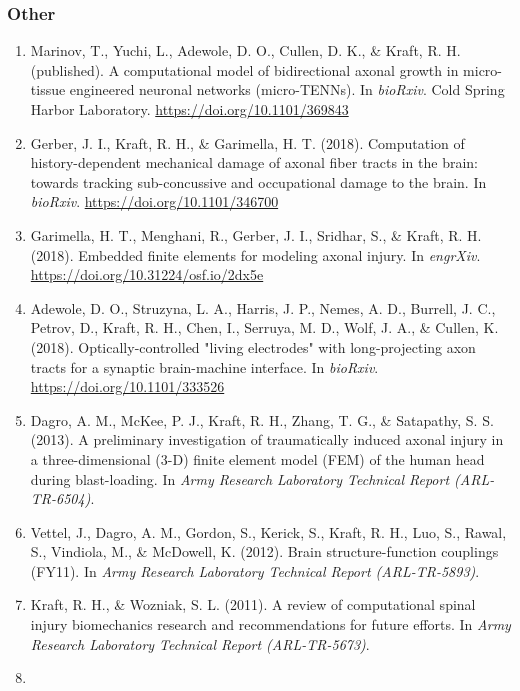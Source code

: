 \documentclass[
]{article}
\begin{document}
\subsubsection{Other}\label{other}

\begin{enumerate}
\def\labelenumi{\arabic{enumi}.}
\item
  Marinov, T., Yuchi, L., Adewole, D. O., Cullen, D. K., \& Kraft, R. H.
  (published). A computational model of bidirectional axonal growth in
  micro-tissue engineered neuronal networks (micro-TENNs). In
  \emph{bioRxiv}. Cold Spring Harbor Laboratory.
  \url{https://doi.org/10.1101/369843}
\item
  Gerber, J. I., Kraft, R. H., \& Garimella, H. T. (2018). Computation
  of history-dependent mechanical damage of axonal fiber tracts in the
  brain: towards tracking sub-concussive and occupational damage to the
  brain. In \emph{bioRxiv}. \url{https://doi.org/10.1101/346700}
\item
  Garimella, H. T., Menghani, R., Gerber, J. I., Sridhar, S., \& Kraft,
  R. H. (2018). Embedded finite elements for modeling axonal injury. In
  \emph{engrXiv}. \url{https://doi.org/10.31224/osf.io/2dx5e}
\item
  Adewole, D. O., Struzyna, L. A., Harris, J. P., Nemes, A. D., Burrell,
  J. C., Petrov, D., Kraft, R. H., Chen, I., Serruya, M. D., Wolf, J.
  A., \& Cullen, K. (2018). Optically-controlled "living electrodes"
  with long-projecting axon tracts for a synaptic brain-machine
  interface. In \emph{bioRxiv}. \url{https://doi.org/10.1101/333526}
\item
  Dagro, A. M., McKee, P. J., Kraft, R. H., Zhang, T. G., \& Satapathy,
  S. S. (2013). A preliminary investigation of traumatically induced
  axonal injury in a three-dimensional (3-D) finite element model (FEM)
  of the human head during blast-loading. In \emph{Army Research
  Laboratory Technical Report (ARL-TR-6504)}.
\item
  Vettel, J., Dagro, A. M., Gordon, S., Kerick, S., Kraft, R. H., Luo,
  S., Rawal, S., Vindiola, M., \& McDowell, K. (2012). Brain
  structure-function couplings (FY11). In \emph{Army Research Laboratory
  Technical Report (ARL-TR-5893)}.
\item
  Kraft, R. H., \& Wozniak, S. L. (2011). A review of computational
  spinal injury biomechanics research and recommendations for future
  efforts. In \emph{Army Research Laboratory Technical Report
  (ARL-TR-5673)}.
\item

\end{enumerate}
\end{document}
